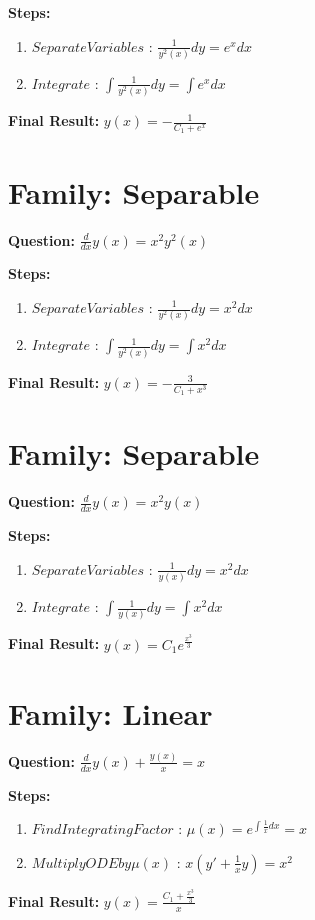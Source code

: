 \documentclass{article}
\begin{document}
\textbf{Steps:}
\begin{enumerate}
\item $Separate Variables$ :  $\frac{1}{y^{2}{\left(x \right)}} dy = e^{x} dx$
\item $Integrate$ :  $\int \frac{1}{y^{2}{\left(x \right)}} dy = \int e^{x} dx$
\end{enumerate}
\textbf{Final Result:} $y{\left(x \right)} = - \frac{1}{C_{1} + e^{x}}$

\section*{Family: Separable}
\textbf{Question:} $\frac{d}{d x} y{\left(x \right)} = x^{2} y^{2}{\left(x \right)}$

\textbf{Steps:}
\begin{enumerate}
\item $Separate Variables$ :  $\frac{1}{y^{2}{\left(x \right)}} dy = x^{2} dx$
\item $Integrate$ :  $\int \frac{1}{y^{2}{\left(x \right)}} dy = \int x^{2} dx$
\end{enumerate}
\textbf{Final Result:} $y{\left(x \right)} = - \frac{3}{C_{1} + x^{3}}$

\section*{Family: Separable}
\textbf{Question:} $\frac{d}{d x} y{\left(x \right)} = x^{2} y{\left(x \right)}$

\textbf{Steps:}
\begin{enumerate}
\item $Separate Variables$ :  $\frac{1}{y{\left(x \right)}} dy = x^{2} dx$
\item $Integrate$ :  $\int \frac{1}{y{\left(x \right)}} dy = \int x^{2} dx$
\end{enumerate}
\textbf{Final Result:} $y{\left(x \right)} = C_{1} e^{\frac{x^{3}}{3}}$

\section*{Family: Linear}
\textbf{Question:} $\frac{d}{d x} y{\left(x \right)} + \frac{y{\left(x \right)}}{x} = x$

\textbf{Steps:}
\begin{enumerate}
\item $Find Integrating Factor$ :  $\mu(x) = e^{\int \frac{1}{x} dx} = x$
\item $Multiply ODE by \mu(x)$ :  $x(y' + \frac{1}{x}y) = x^{2}$
\end{enumerate}
\textbf{Final Result:} $y{\left(x \right)} = \frac{C_{1} + \frac{x^{3}}{3}}{x}$
\end{document}
